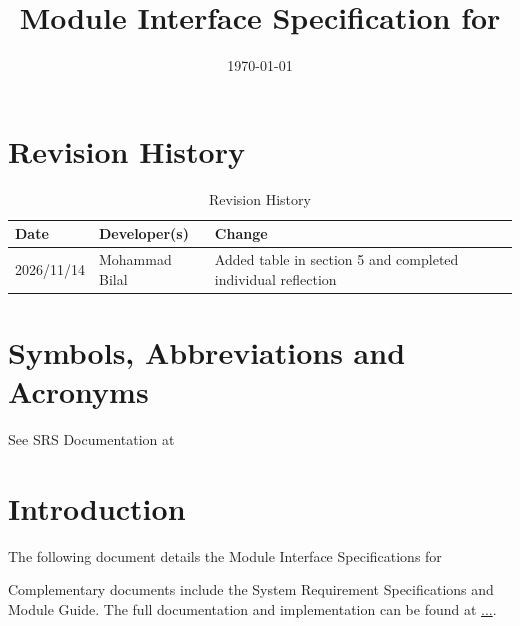 \documentclass[10pt, titlepage]{article}
\begin{document}
\title{Module Interface Specification for \progname{}}

\author{\authname}

\date{\today}

\maketitle


\section{Revision History}

\begin{table}[!htbp]
\caption{Revision History} \label{TblRevisionHistory}
\begin{tabularx}{\textwidth}{llX}
\toprule
\textbf{Date} & \textbf{Developer(s)} & \textbf{Change}\\
\midrule
2026/11/14 & Mohammad Bilal & Added table in section 5 and completed individual reflection \\
\bottomrule
\end{tabularx}
\end{table}

\newpage

\tableofcontents


\newpage

\section{Symbols, Abbreviations and Acronyms}

See SRS Documentation at 


\newpage

\section{Introduction}

The following document details the Module Interface Specifications for

Complementary documents include the System Requirement Specifications
and Module Guide.  The full documentation and implementation can be
found at \url{...}.  
\end{document}
